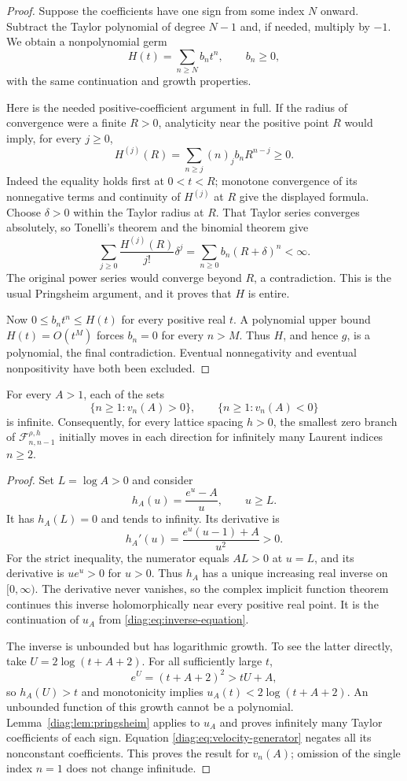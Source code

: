 \begin{proof}
Suppose the coefficients have one sign from some index $N$ onward.
Subtract the Taylor polynomial of degree $N-1$ and, if needed, multiply
by $-1$.  We obtain a nonpolynomial germ
\[
 H(t)=\sum_{n\geq N}b_n t^n,\qquad b_n\geq0,
\]
with the same continuation and growth properties.

Here is the needed positive-coefficient argument in full.  If the radius
of convergence were a finite $R>0$, analyticity near the positive point
$R$ would imply, for every $j\geq0$,
\[
 H^{(j)}(R)=\sum_{n\geq j}(n)_j b_n R^{n-j}\geq0.
\]
Indeed the equality holds first at $0<t<R$; monotone convergence of its
nonnegative terms and continuity of $H^{(j)}$ at $R$ give the displayed
formula.  Choose $\delta>0$ within the Taylor radius at $R$.  That Taylor
series converges absolutely, so Tonelli's theorem and the binomial theorem
give
\[
 \sum_{j\geq0}\frac{H^{(j)}(R)}{j!}\delta^j
     =\sum_{n\geq0}b_n(R+\delta)^n<\infty.
\]
The original power series would converge beyond $R$, a contradiction.
This is the usual Pringsheim argument, and it proves that $H$ is entire.

Now $0\leq b_n t^n\leq H(t)$ for every positive real $t$.  A polynomial
upper bound $H(t)=O(t^M)$ forces $b_n=0$ for every $n>M$.  Thus $H$, and
hence $g$, is a polynomial, the final contradiction.  Eventual
nonnegativity and eventual nonpositivity have both been excluded.
\end{proof}

\begin{theorem}\label{diag:thm:oscillation}
For every $A>1$, each of the sets
\[
 \{n\geq1:v_n(A)>0\},\qquad \{n\geq1:v_n(A)<0\}
\]
is infinite.  Consequently, for every lattice spacing $h>0$, the smallest
zero branch of $\mathscr F_{n,n-1}^{\rho,h}$ initially moves in each
direction for infinitely many Laurent indices $n\geq2$.
\end{theorem}

\begin{proof}
Set $L=\log A>0$ and consider
\[
 h_A(u)=\frac{e^u-A}{u},\qquad u\geq L.
\]
It has $h_A(L)=0$ and tends to infinity.  Its derivative is
\[
 h_A'(u)=\frac{e^u(u-1)+A}{u^2}>0.
\]
For the strict inequality, the numerator equals $AL>0$ at $u=L$, and its
derivative is $ue^u>0$ for $u>0$.  Thus $h_A$ has a unique increasing real
inverse on $[0,\infty)$.  The derivative never vanishes, so the complex
implicit function theorem continues this inverse holomorphically near
every positive real point.  It is the continuation of $u_A$ from
\eqref{diag:eq:inverse-equation}.

The inverse is unbounded but has logarithmic growth.  To see the latter
directly, take $U=2\log(t+A+2)$.  For all sufficiently large $t$,
\[
 e^U=(t+A+2)^2>tU+A,
\]
so $h_A(U)>t$ and monotonicity implies
$u_A(t)<2\log(t+A+2)$.  An unbounded function of this growth cannot be a
polynomial.  Lemma~\ref{diag:lem:pringsheim} applies to $u_A$ and proves
infinitely many Taylor coefficients of each sign.  Equation
\eqref{diag:eq:velocity-generator} negates all its nonconstant
coefficients.  This proves the result for $v_n(A)$; omission of the single
index $n=1$ does not change infinitude.
\end{proof}

